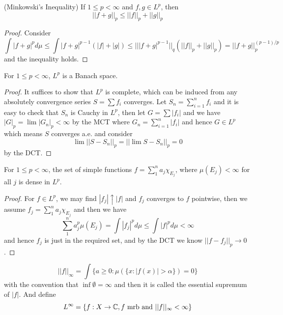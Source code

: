 \begin{theorem}
    (Minkowski's Inequality) If $1\leq p <\infty$ and $f,g \in L^p$, then
    \[||f+g||_p \leq ||f||_p + ||g||_p\]
\end{theorem}
\begin{proof}\par
    Consider
    \[
    \int |f+g|^p d\mu \leq \int |f+g|^{p-1}(|f|+|g|) \leq |||f+g|^{p-1}||_q(||f||_p+||g||_p) = ||f+g||_p^{(p-1)/p}
    \]
    and the inequality holds.
\end{proof}

\begin{theorem}
    For $1\leq p < \infty$, $L^p$ is a Banach space.
\end{theorem}
\begin{proof}\par
    It suffices to show that $L^p$ is complete, which can be induced from any absolutely convergence series $S=\sum\limits f_i$ converges. Let $S_n = \sum\limits_{i=1}^n f_i$ and it is easy to check that $S_n$ is Cauchy in $L^p$, then let $G = \sum |f_i|$ and we have $|G|_p = \lim |G_n|_p < \infty$ by the MCT where $G_n = \sum\limits_{i=1}^n |f_i|$ and hence $G\in L^p$ which means $S$ converges a.e. and consider
    \[ \lim||S-S_n||_p = ||\lim S-S_n||_p = 0\]
    by the DCT.
\end{proof}

\begin{proposition}
    For $ 1\leq p < \infty$, the set of simple functions $f = \sum\limits_1^n a_j \chi_{E_j}$, where $\mu(E_j) < \infty$ for all $j$ is dense in $L^p$.
\end{proposition}

\begin{proof}\par
    For $f\in L^p$, we may find $|f_j|\uparrow |f|$ and $f_j$ converges to $f$ pointwise, then we assume $f_j = \sum_1^n a_j\chi_{E_j}$ and then we have
    \[
    \sum_1^n a_j^p\mu(E_j) = \int |f_j|^p d\mu \leq \int |f|^p d\mu <\infty
    \]
    and hence $f_j$ is just in the required set, and by the DCT we know $||f-f_j||_p \to 0$.
\end{proof}

\begin{definition}
    \[||f||_{\infty} = \int\{a \geq 0:\mu(\{x:|f(x)|>\alpha\}) = 0\}\]
    with the convention that $\inf\emptyset = \infty$ and then it is called the essential supremum of $|f|$. And define
    \[L^{\infty} = \{f:X\to\mathbb{C}, f\text{ mrb and }||f||_{\infty} < \infty\}\]
\end{definition}

